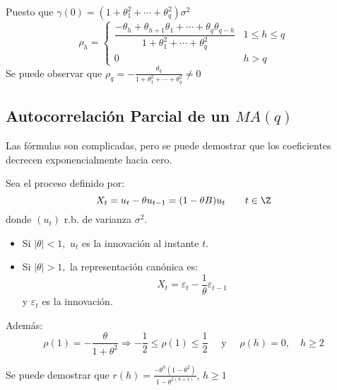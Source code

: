 Puesto que $\gamma \left( 0 \right)=(1+\theta_{1}^{2} +\cdots+\theta 
_{q}^{2} )\sigma^{2}$
\[
\rho_{h} =\begin{cases}
           \dfrac{-\theta_{h} +\theta_{h+1} \theta_{1} +\cdots+\theta_{q} \theta_{q-h} }{1+\theta_{1}^{2} +\cdots+\theta_{q}^{2} } & 1\le h\le q\\
            0 & h>q
          \end{cases}
\]
Se puede observar que $\rho_{q} =-\frac{\theta_{q} }{1+\theta_{1}^{2} 
+\cdots+\theta_{q}^{2} }\ne 0$

\subsection{Autocorrelaci\'{o}n Parcial de un $MA (q)$}

Las f\'{o}rmulas son complicadas, pero se puede demostrar que los coeficientes 
decrecen exponencialmente hacia cero.

\begin{ejemplo}
 Sea el proceso definido por:
\[
X_{t} =u_{t} -\theta u_{t-1} =(1-\theta B)u_{t} 
\qquad
t\in \Z
\]
donde $(u_{t} )$ r.b. de varianza $\sigma^{2}$.

\begin{itemize}
\item Si $\left| \theta \right|<1,$ $u_{{t}}$ es la innovaci\'{o}n al instante $t$.
\item Si $\left| \theta \right|>1,$ la representaci\'{o}n can\'{o}nica es:
\[
X_{t} =\varepsilon_{t} -\frac{1}{\theta }\varepsilon_{t-1} 
\]
y $\varepsilon_{t} $ es la innovaci\'{o}n.
\end{itemize}

Adem\'{a}s:
\[
 \rho \left( 1 \right)=-\frac{\theta }{1+\theta^{2}}\Rightarrow 
-\frac{1}{2}\le \rho \left( 1 \right)\le \frac{1}{2}\quad\text{ y }\quad\rho \left( h 
\right)=0, \quad h\ge 2
\]


Se puede demostrar que $r\left( h \right)=\frac{-\theta^{h}(1-\theta 
^{2})}{1-\theta^{2(h+1)}}$, $h\ge 1$
\end{ejemplo}


